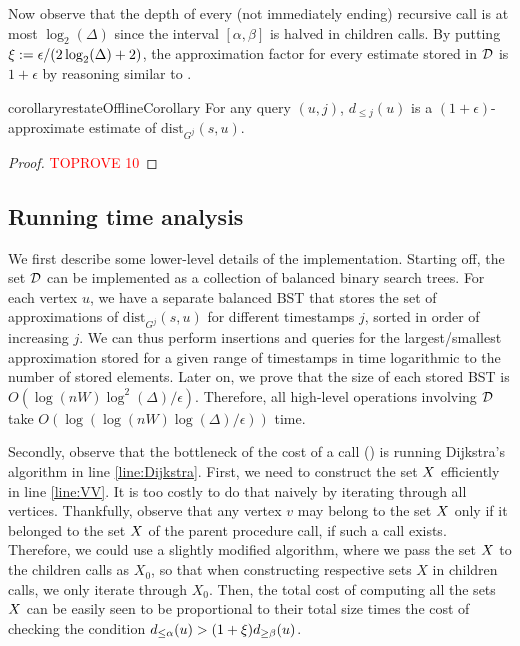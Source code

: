 \documentclass[11pt,letterpaper]{article}
\theoremstyle{plain}
\renewcommand{\O}{O}
\newcommand{\eps}{\ensuremath{\epsilon}}
\newcommand{\dist}{\mathrm{dist}}
\begin{document}
Now observe that the depth of every (not immediately ending) recursive call is at most $\log_2(\Delta)$ since the interval $[\alpha,\beta]$ is halved in children calls.
By putting $\epsp:=\eps/(2\log_2(\Delta)+2)$, the approximation factor for every estimate stored in $\mathcal{D}$ is $1 + \eps$ by reasoning similar to .

\begin{restatable}[]{corollary}{restateOfflineCorollary}
For any query $(u, j)$, $d_{\le j}(u)$ is a $(1 + \eps)$-approximate estimate of $\dist_{G^j}(s,u)$.
\end{restatable}
\begin{proof}\textcolor{red}{TOPROVE 10}\end{proof}



\subsection{Running time analysis}

We first describe some lower-level details of the implementation.
Starting off, the set $\mathcal{D}$ can be implemented as a collection of balanced binary search trees.
For each vertex $u$, we have a separate balanced BST that stores the set of approximations of $\dist_{G^j}(s,u)$ for different timestamps $j$, sorted in order of increasing $j$.
We can thus perform insertions and queries for the largest/smallest approximation stored for a given range of timestamps in time logarithmic to the number of stored elements.
Later on, we prove that the size of each stored BST is $\O(\log(nW) \log^2(\Delta) / \eps)$.
Therefore, all high-level operations involving $\mathcal{D}$ take $\O(\log(\log(nW)\log(\Delta)/\eps))$ time.

Secondly, observe that the bottleneck of the cost of a call  () is running Dijkstra's algorithm in line \ref{line:Dijkstra}.
First, we need to construct the set $X$ efficiently in line \ref{line:VV}.
It is too costly to do that naively by iterating through all vertices.
Thankfully, observe that any vertex $v$ may belong to the set $X$ only if it belonged to the set $X$ of the parent procedure call, if such a call exists.
Therefore, we could use a slightly modified algorithm, where we pass the set $X$ to the children calls as $X_0$, so that when constructing respective sets $X$ in children calls, we only iterate through $X_0$.
Then, the total cost of computing all the sets $X$ can be easily seen to be proportional to their total size times the cost of checking the condition $d_{\le\alpha}(u) > (1 + \xi)d_{\ge\beta}(u)$.
\end{document}
